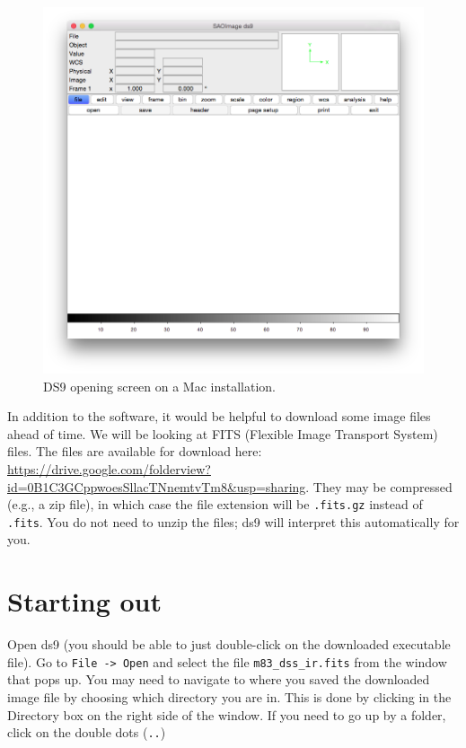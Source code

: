 \documentclass[12pt]{article}
\begin{document}
\begin{figure}[h]
  \centering
  \includegraphics[width=0.6\linewidth]{ds9_screenshot.png}
  \caption{DS9 opening screen on a Mac installation.}
  \label{fig:open}
\end{figure}

In addition to the software, it would be helpful to download some image files ahead of time.  We will be looking at FITS (Flexible Image Transport System) files.  The files are available for download here:
\url{https://drive.google.com/folderview?id=0B1C3GCppwoesSllacTNnemtvTm8&usp=sharing}.  They may be compressed (e.g., a zip file), in which case the file extension will be \texttt{.fits.gz} instead of \texttt{.fits}.  You do not need to unzip the files; ds9 will interpret this automatically for you.

\section{Starting out}
\label{sec:start}

Open ds9 (you should be able to just double-click on the downloaded executable file).  Go to \texttt{File -> Open} and select the file \texttt{m83\_dss\_ir.fits} from the window that pops up. %
You may need to navigate to where you saved the downloaded image file by choosing which directory you are in.  This is done by clicking in the Directory box on the right side of the window.  If you need to go up by a folder, click on the double dots (\texttt{..}) 

\end{document}
